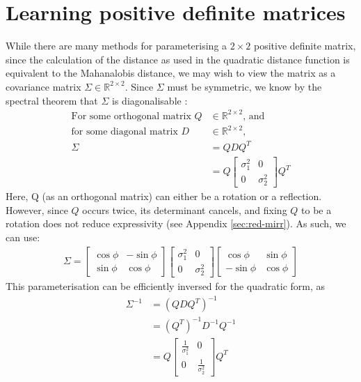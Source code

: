 \documentclass[a4paper, 12pt]{report}
\begin{document}
\section{Learning positive definite matrices}
\label{sec:learning-pdm}
While there are many methods for parameterising a $2\times2$ positive definite matrix, since the calculation of the distance as used in the quadratic distance function is equivalent to the Mahanalobis distance, we may wish to view the matrix as a covariance matrix $\Sigma \in \mathbb{R}^{2\times2}$. Since $\Sigma$ must be symmetric, we know by the spectral theorem that $\Sigma$ is diagonalisable \cite{poole2015linear}:
\begin{align}
\textrm{For some orthogonal matrix }Q &\in \mathbb{R}^{2\times 2} \textrm{, and} \nonumber \\
\textrm{for some diagonal matrix }D &\in \mathbb{R}^{2\times 2} \textrm{,}\nonumber \\
\Sigma &= QDQ^T\\
&= Q \begin{bmatrix}
	 \sigma_1^2 & 0\\ 0 &  \sigma_2^2
\end{bmatrix} Q^T
\end{align}
Here, Q (as an orthogonal matrix) can either be a rotation  or a reflection. However, since $Q$ occurs twice, its determinant cancels, and fixing $Q$ to be a rotation does not reduce expressivity (see Appendix \ref{sec:red-mirr}). As such, we can use:
\begin{align}
\Sigma = \begin{bmatrix}
	\cos \phi & -\sin \phi \\ \sin\phi & \cos\phi
\end{bmatrix}\begin{bmatrix}
	 \sigma_1^2 & 0\\ 0 &  \sigma_2^2
\end{bmatrix} \begin{bmatrix}
	\cos \phi & \sin \phi \\ -\sin\phi & \cos\phi
\end{bmatrix}
\end{align}
This parameterisation can be efficiently inversed for the quadratic form, as \begin{align}
	\Sigma^{-1} &= (QDQ^T)^{-1}\\
	&= (Q^T)^{-1} D^{-1} Q^{-1}\\
	&= Q\begin{bmatrix}
	 \frac{1}{\sigma_1^2} & 0\\ 0 &  \frac{1}{\sigma_2^2}
\end{bmatrix}Q^T
\end{align}
\end{document}
